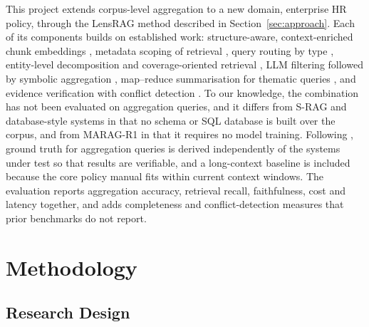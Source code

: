 \documentclass[11pt,letterpaper,oneside]{report}
\begin{document}
This project extends corpus-level aggregation
\citep{luo2025globalrag,zhu2026aggbench} to a new domain, enterprise HR
policy, through the LensRAG method described in Section~\ref{sec:approach}.
Each of its components builds on established work: structure-aware,
context-enriched chunk embeddings
\citep{gunther2024latechunking,maharjan2026chunking}, metadata scoping of
retrieval \citep{maio2026olap,subedi2026dilution}, query routing by type
\citep{li2025structrag,han2026ragvsgraphrag}, entity-level decomposition and
coverage-oriented retrieval
\citep{ammann2025decomposition,sveistrys2025plurihop,yang2026sparcrag}, LLM
filtering followed by symbolic aggregation \citep{luo2025globalrag},
map--reduce summarisation for thematic queries \citep{edge2024graphrag}, and
evidence verification with conflict detection
\citep{yan2024crag,hong2026egrag}. To our knowledge, the combination has not
been evaluated on aggregation queries, and it differs from S-RAG
\citep{koshorek2025srag} and database-style systems \citep{patel2025lotus} in
that no schema or SQL database is built over the corpus, and from MARAG-R1
\citep{luo2025maragr1} in that it requires no model training. Following
\citet{lu2026corpusqa}, ground truth for aggregation queries is derived
independently of the systems under test so that results are verifiable, and
a long-context baseline is included because the core policy manual fits
within current context windows. The evaluation reports aggregation accuracy,
retrieval recall, faithfulness, cost and latency together, and adds
completeness and conflict-detection measures that prior benchmarks do not
report.

\chapter{Methodology}
\label{ch:methodology}

\section{Research Design}
\label{sec:design}
\end{document}

